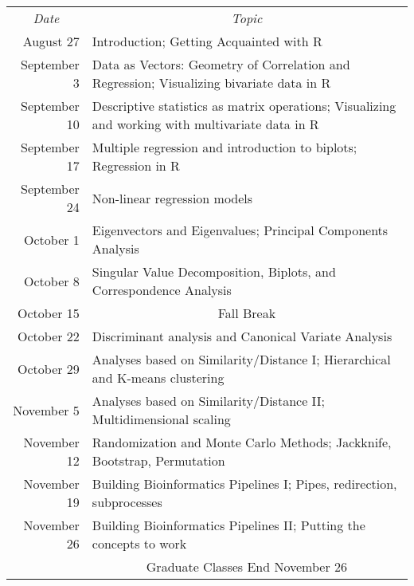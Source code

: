 \documentclass[11pt,letterpaper]{article}
\begin{document}
\renewcommand{\arraystretch}{1.4}
\begin{center}
\begin{tabular}{rp{5.5in}}
\multicolumn{1}{c}{{\sl Date}} & \multicolumn{1}{c}{{\sl Topic}} \\

August 27 & Introduction; Getting Acquainted with R \\
September 3 & Data as Vectors: Geometry of Correlation and Regression; Visualizing bivariate data in R\\
September 10 & Descriptive statistics as matrix operations; Visualizing and working with multivariate data in R\\
September 17 & Multiple regression and introduction to biplots; Regression in R\\
September 24 & Non-linear regression models\\
October 1 & Eigenvectors and Eigenvalues; Principal Components Analysis \\
October 8 & Singular Value Decomposition, Biplots, and Correspondence Analysis\\
October 15 & \multicolumn{1}{c}{{\sc Fall Break}} \\
October 22 & Discriminant analysis and Canonical Variate Analysis\\
October 29 & Analyses based on Similarity/Distance I; Hierarchical and K-means clustering\\
November 5 & Analyses based on Similarity/Distance II; Multidimensional scaling\\
November 12 & Randomization and Monte Carlo Methods; Jackknife, Bootstrap, Permutation\\
November 19 & Building Bioinformatics Pipelines I; Pipes, redirection, subprocesses \\
November 26 & Building Bioinformatics Pipelines II; Putting the concepts to work \\

& \multicolumn{1}{c}{{\sc Graduate Classes End November 26}} \\
\end{tabular}
\end{center}
\end{document}

